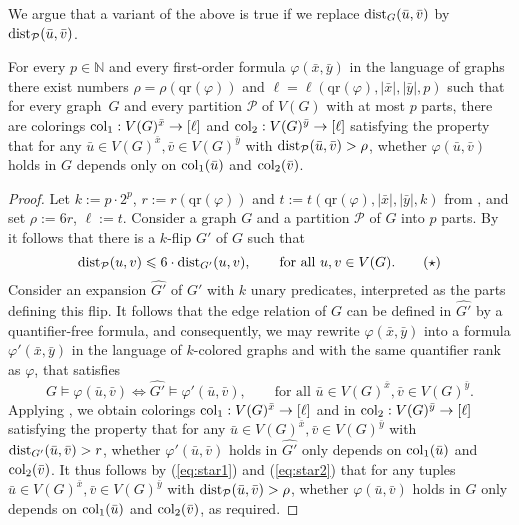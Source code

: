 \documentclass[a4paper,UKenglish,cleveref, autoref, thm-restate]{lipics-v2021}
\newcommand{\qr}{\mathrm{qr}}
\newcommand{\N}[0]{\mathrm{\mathbb{N}}}
\newcommand{\col}{\textnormal{col}}
\newcommand{\dist}{\textnormal{dist}}
\renewcommand{\phi}{\varphi}
\newcommand{\PP}{\mathcal{P}}
\renewcommand{\le}{\leqslant}
\renewcommand{\leq}{\le}
\begin{document}
We argue that a variant of the above is true if we replace $\dist_G(\bar u, \bar v)$ by $\dist_{\PP}(\bar u, \bar v)$.

\begin{lemma}\label{lem:partition-gaifman}
    For every $p \in\N$ and every first-order formula $\phi(\bar x, \bar y)$ in the language of graphs there exist numbers $\rho = \rho(\qr(\phi))$ and $\ell = \ell(\qr(\phi), |\bar x|, |\bar y|, p)$ such that for every graph~$G$ and every partition $\PP$ of $V(G)$ with at most $p$ parts, there are colorings $\col_1:V(G)^{\bar x} \to [\ell]$ and $\col_2: V(G)^{\bar y} \to [\ell]$ satisfying the property that for any  $\bar u \in V(G)^{\bar x}, \bar v \in V(G)^{\bar y}$ with $\dist_\PP(\bar u, \bar v) > \rho$, whether $\phi(\bar u, \bar v)$ holds in $G$ depends only on $\col_1(\bar u)$ and $\col_2(\bar v)$.
  \end{lemma}

\begin{proof}
    Let $k:=p\cdot 2^p$, $r := r(\qr(\phi))$ and $t := t(\qr(\phi),|\bar x|,|\bar y|,k)$ from , and set $\rho:=6r$, $\ell:=t$. Consider a graph $G$ and a partition $\PP$ of $G$ into $p$ parts. By  it follows that there is a $k$-flip $G'$ of $G$ such that 
      \[ \dist_{\PP}(u,v)\leq 6\cdot \dist_{G'}(u,v), \qquad \text{for all } u,v \in V(G).\tag{$\star$}\label{eq:star1}\]
    Consider an expansion $\hat{G'}$ of $G'$ with $k$ unary predicates, interpreted as the parts defining this flip. It follows that the edge relation of $G$ can be defined in $\hat{G'}$ by a quantifier-free formula, and consequently, we may rewrite $\phi(\bar x, \bar y)$ into a formula $\phi'(\bar x, \bar y)$ in the language of $k$-colored graphs and with the same quantifier rank as $\phi$, that satisfies 
    \[ G \models \phi(\bar u, \bar v) \iff \hat{G'}\models \phi'(\bar u,\bar v), \qquad \text{for all }\bar u \in V(G)^{\bar x},\bar v \in V(G)^{\bar y}.\tag{$\star\star$}\label{eq:star2}\]
    Applying , we obtain colorings $\col_1:V(G)^{\bar x} \to [\ell]$ and in $\col_2:V(G)^{\bar y}\to [\ell]$ satisfying the property that for any $\bar u \in V(G)^{\bar x},\bar v \in V(G)^{\bar y}$ with $\dist_{G'}(\bar u,\bar v)>r$, whether $\phi'(\bar u,\bar v)$ holds in $\hat{G'}$ only depends on $\col_1(\bar u)$ and $\col_2(\bar v)$. It thus follows by (\ref{eq:star1}) and (\ref{eq:star2}) that for any tuples $\bar u \in V(G)^{\bar x},\bar v \in V(G)^{\bar y}$ with $\dist_{\PP}(\bar u,\bar v)>\rho$, whether $\phi(\bar u,\bar v)$ holds in $G$ only depends on $\col_1(\bar u)$ and $\col_2(\bar v)$, as required.
\end{proof}
  
\end{document}
